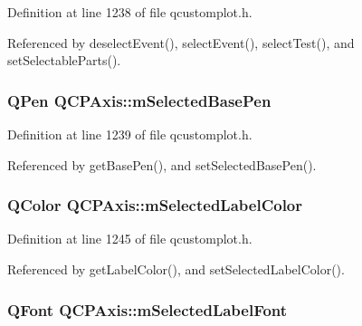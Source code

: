 Definition at line 1238 of file qcustomplot.\+h.



Referenced by deselect\+Event(), select\+Event(), select\+Test(), and set\+Selectable\+Parts().

\hypertarget{class_q_c_p_axis_a80baa4e3c16f9b6edf3eccacd2a50fde}{}
\subsubsection[{m\+Selected\+Base\+Pen}]{\setlength{\rightskip}{0pt plus 5cm}Q\+Pen Q\+C\+P\+Axis\+::m\+Selected\+Base\+Pen\hspace{0.3cm}{\ttfamily [protected]}}\label{class_q_c_p_axis_a80baa4e3c16f9b6edf3eccacd2a50fde}


Definition at line 1239 of file qcustomplot.\+h.



Referenced by get\+Base\+Pen(), and set\+Selected\+Base\+Pen().

\hypertarget{class_q_c_p_axis_a94f57de3ba024471ca206d83cf2258dd}{}
\subsubsection[{m\+Selected\+Label\+Color}]{\setlength{\rightskip}{0pt plus 5cm}Q\+Color Q\+C\+P\+Axis\+::m\+Selected\+Label\+Color\hspace{0.3cm}{\ttfamily [protected]}}\label{class_q_c_p_axis_a94f57de3ba024471ca206d83cf2258dd}


Definition at line 1245 of file qcustomplot.\+h.



Referenced by get\+Label\+Color(), and set\+Selected\+Label\+Color().

\hypertarget{class_q_c_p_axis_ae48fe3489afadc0b3cd003233e2bf19f}{}
\subsubsection[{m\+Selected\+Label\+Font}]{\setlength{\rightskip}{0pt plus 5cm}Q\+Font Q\+C\+P\+Axis\+::m\+Selected\+Label\+Font\hspace{0.3cm}{\ttfamily [protected]}}\label{class_q_c_p_axis_ae48fe3489afadc0b3cd003233e2bf19f}


